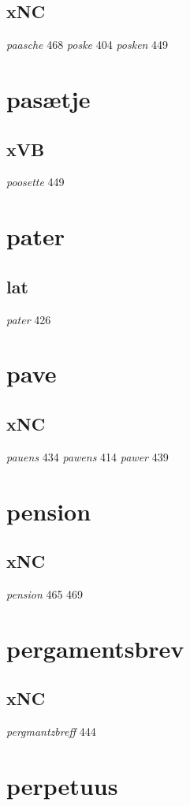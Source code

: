 \documentclass[a4paper,twocolumn]{article}
\begin{document}
\subsection{xNC}
\label{sec:org9610a67}
\emph{paasche} 468 \emph{poske} 404 \emph{posken} 449 
\section{pasætje}
\label{sec:org9436092}
\subsection{xVB}
\label{sec:orgfae5bd2}
\emph{poosette} 449 
\section{pater}
\label{sec:org45e880d}
\subsection{lat}
\label{sec:orgdcd1d73}
\emph{pater} 426 
\section{pave}
\label{sec:org69ae2ab}
\subsection{xNC}
\label{sec:org874b211}
\emph{pauens} 434 \emph{pawens} 414 \emph{pawer} 439 
\section{pension}
\label{sec:org917696a}
\subsection{xNC}
\label{sec:orgd84c467}
\emph{pension} 465 469 
\section{pergamentsbrev}
\label{sec:org6e52986}
\subsection{xNC}
\label{sec:org3130e35}
\emph{pergmantzbreff} 444 
\section{perpetuus}
\label{sec:org75caea8}
\end{document}
